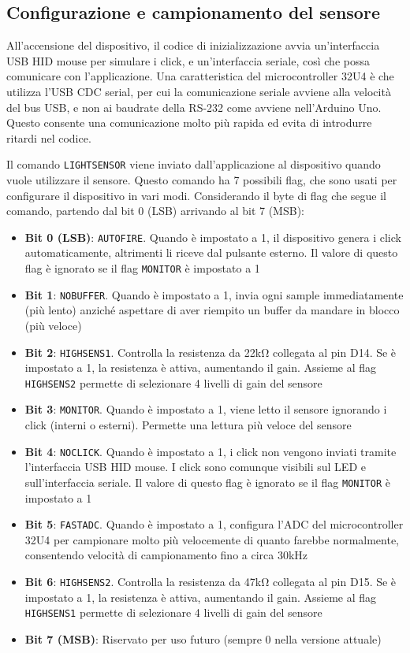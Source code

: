\subsection{Configurazione e campionamento del sensore}
All'accensione del dispositivo, il codice di inizializzazione avvia un'interfaccia USB HID mouse per simulare i click, e un'interfaccia seriale, così che possa comunicare con l'applicazione. Una caratteristica del microcontroller 32U4 è che utilizza l'USB CDC serial, per cui la comunicazione seriale avviene alla velocità del bus USB, e non ai baudrate della RS-232 come avviene nell'Arduino Uno. Questo consente una comunicazione molto più rapida ed evita di introdurre ritardi nel codice.

Il comando \texttt{LIGHTSENSOR} viene inviato dall'applicazione al dispositivo quando vuole utilizzare il sensore. Questo comando ha 7 possibili flag, che sono usati per configurare il dispositivo in vari modi. Considerando il byte di flag che segue il comando, partendo dal bit 0 (LSB) arrivando al bit 7 (MSB):
\begin{itemize}
	\item \textbf{Bit 0 (LSB)}: \texttt{AUTOFIRE}. Quando è impostato a 1, il dispositivo genera i click automaticamente, altrimenti li riceve dal pulsante esterno. Il valore di questo flag è ignorato se il flag \texttt{MONITOR} è impostato a 1
	\item \textbf{Bit 1}: \texttt{NOBUFFER}. Quando è impostato a 1, invia ogni sample immediatamente (più lento) anziché aspettare di aver riempito un buffer da mandare in blocco (più veloce)
	\item \textbf{Bit 2}: \texttt{HIGHSENS1}. Controlla la resistenza da 22k\si{\ohm} collegata al pin D14. Se è impostato a 1, la resistenza è attiva, aumentando il gain. Assieme al flag \texttt{HIGHSENS2} permette di selezionare 4 livelli di gain del sensore
	\item \textbf{Bit 3}: \texttt{MONITOR}. Quando è impostato a 1, viene letto il sensore ignorando i click (interni o esterni). Permette una lettura più veloce del sensore
	\item \textbf{Bit 4}: \texttt{NOCLICK}. Quando è impostato a 1, i click non vengono inviati tramite l'interfaccia USB HID mouse. I click sono comunque visibili sul LED e sull'interfaccia seriale. Il valore di questo flag è ignorato se il flag \texttt{MONITOR} è impostato a 1
	\item \textbf{Bit 5}: \texttt{FASTADC}. Quando è impostato a 1, configura l'ADC del microcontroller 32U4 per campionare molto più velocemente di quanto farebbe normalmente, consentendo velocità di campionamento fino a circa 30kHz
	\item \textbf{Bit 6}: \texttt{HIGHSENS2}. Controlla la resistenza da 47k\si{\ohm} collegata al pin D15. Se è impostato a 1, la resistenza è attiva, aumentando il gain. Assieme al flag \texttt{HIGHSENS1} permette di selezionare 4 livelli di gain del sensore
	\item \textbf{Bit 7 (MSB)}: Riservato per uso futuro (sempre 0 nella versione attuale)
\end{itemize}

